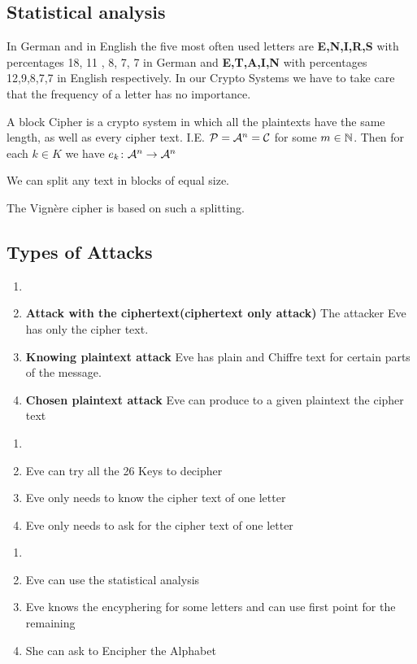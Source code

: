 \subsection{Statistical analysis}
In German and in English the five most often used letters are 
\textbf{E,N,I,R,S} with percentages 18, 11 , 8, 7, 7 in German and \textbf{E,T,A,I,N} with percentages
12,9,8,7,7 in English respectively.
In our Crypto Systems we have to take care that the frequency of a letter has no importance.
\begin{Def} 
A block Cipher is a crypto system in which all the plaintexts have the same length, as well as every cipher text. I.E. \(\mathcal{P}=\mathcal{A}^n=\mathcal{C}\) for some \(m\in \mathbb{N}\).
Then for each \(k\in K\) we have \(e_k\colon \mathcal{A}^n\to \mathcal{A}^n\)

\end{Def}
\begin{Bem}
We can split any text in blocks of equal size.
\end{Bem}
\begin{Bsp} The Vignère cipher is based on such a splitting.
\end{Bsp}
\subsection{Types of Attacks}
\begin{enumerate}
\item[]
\item \textbf{Attack with the ciphertext(ciphertext only attack)}
The attacker Eve has only the cipher text.
\item \textbf{Knowing plaintext attack}
Eve has plain and Chiffre text for certain parts of the message.
\item \textbf{Chosen plaintext attack}
Eve can produce to a given plaintext the cipher text
\end{enumerate}
\begin{Bsp}
\begin{enumerate}
\item[]
\item Eve can try all the 26 Keys to decipher
\item Eve only needs to know the cipher text of one letter
\item Eve only needs to ask for the cipher text of one letter
\end{enumerate}
\end{Bsp}
\begin{Bsp}
\begin{enumerate}
\item[]
\item Eve can use the statistical analysis 
\item Eve knows the encyphering for some letters and can use first point for the remaining
\item She can ask to Encipher the Alphabet 
\end{enumerate}
\end{Bsp}
